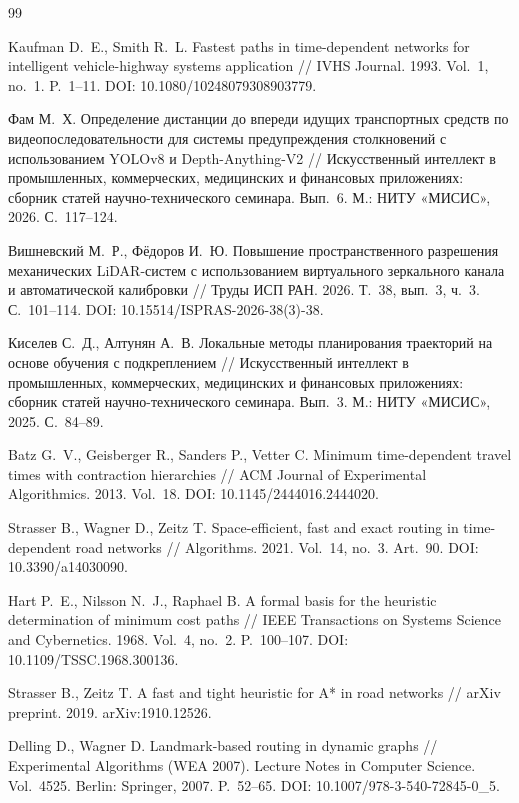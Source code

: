 \documentclass{misisarticle}
\begin{document}
\renewcommand{\refname}{ЛИТЕРАТУРА}
\begin{thebibliography}{99}

 Kaufman D.~E., Smith R.~L. Fastest paths in time-dependent networks for intelligent vehicle-highway systems application // IVHS Journal. 1993. Vol.~1, no.~1. P.~1--11. DOI: 10.1080/10248079308903779.

 Фам М.~Х. Определение дистанции до впереди идущих транспортных средств по видеопоследовательности для системы предупреждения столкновений с использованием YOLOv8 и Depth-Anything-V2 // Искусственный интеллект в промышленных, коммерческих, медицинских и финансовых приложениях: сборник статей научно-технического семинара. Вып.~6. М.: НИТУ «МИСИС», 2026. С.~117--124.

 Вишневский М.~Р., Фёдоров И.~Ю. Повышение пространственного разрешения механических LiDAR-систем с использованием виртуального зеркального канала и автоматической калибровки // Труды ИСП РАН. 2026. Т.~38, вып.~3, ч.~3. С.~101--114. DOI: 10.15514/ISPRAS-2026-38(3)-38.

 Киселев С.~Д., Алтунян А.~В. Локальные методы планирования траекторий на основе обучения с подкреплением // Искусственный интеллект в промышленных, коммерческих, медицинских и финансовых приложениях: сборник статей научно-технического семинара. Вып.~3. М.: НИТУ «МИСИС», 2025. С.~84--89.

 Batz G.~V., Geisberger R., Sanders P., Vetter C. Minimum time-dependent travel times with contraction hierarchies // ACM Journal of Experimental Algorithmics. 2013. Vol.~18. DOI: 10.1145/2444016.2444020.

 Strasser B., Wagner D., Zeitz T. Space-efficient, fast and exact routing in time-dependent road networks // Algorithms. 2021. Vol.~14, no.~3. Art.~90. DOI: 10.3390/a14030090.

 Hart P.~E., Nilsson N.~J., Raphael B. A formal basis for the heuristic determination of minimum cost paths // IEEE Transactions on Systems Science and Cybernetics. 1968. Vol.~4, no.~2. P.~100--107. DOI: 10.1109/TSSC.1968.300136.

 Strasser B., Zeitz T. A fast and tight heuristic for A* in road networks // arXiv preprint. 2019. arXiv:1910.12526.

 Delling D., Wagner D. Landmark-based routing in dynamic graphs // Experimental Algorithms (WEA 2007). Lecture Notes in Computer Science. Vol.~4525. Berlin: Springer, 2007. P.~52--65. DOI: 10.1007/978-3-540-72845-0\_5.


\end{thebibliography}
\end{document}
